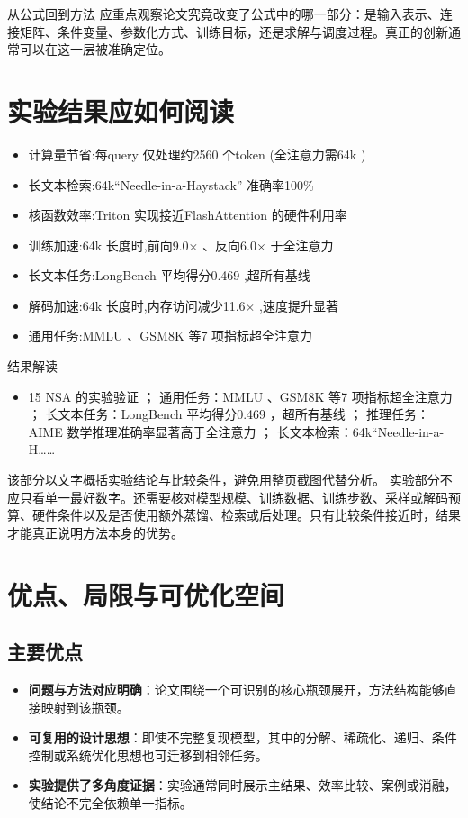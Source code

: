 \documentclass[UTF8,11pt,a4paper]{ctexart}
\newcommand{\term}[1]{\textbf{\textcolor{mainblue}{#1}}}
\begin{document}
\begin{keybox}{从公式回到方法}
应重点观察论文究竟改变了公式中的哪一部分：是输入表示、连接矩阵、条件变量、参数化方式、训练目标，还是求解与调度过程。真正的创新通常可以在这一层被准确定位。
\end{keybox}


\section{实验结果应如何阅读}
\begin{itemize}
\item 计算量节省:每query 仅处理约2560 个token (全注意力需64k )
\item 长文本检索:64k“Needle-in-a-Haystack” 准确率100\%
\item 核函数效率:Triton 实现接近FlashAttention 的硬件利用率
\item 训练加速:64k 长度时,前向9.0× 、反向6.0× 于全注意力
\item 长文本任务:LongBench 平均得分0.469 ,超所有基线
\item 解码加速:64k 长度时,内存访问减少11.6× ,速度提升显著
\item 通用任务:MMLU 、GSM8K 等7 项指标超全注意力
\end{itemize}

\begin{notebox}{结果解读}
\begin{itemize}
\item 15 NSA 的实验验证 ； 通用任务：MMLU 、GSM8K 等7 项指标超全注意力 ； 长文本任务：LongBench 平均得分0.469 ，超所有基线 ； 推理任务：AIME 数学推理准确率显著高于全注意力 ； 长文本检索：64k“Needle-in-a-H……
\end{itemize}
\end{notebox}

该部分以文字概括实验结论与比较条件，避免用整页截图代替分析。
实验部分不应只看单一最好数字。还需要核对模型规模、训练数据、训练步数、采样或解码预算、硬件条件以及是否使用额外蒸馏、检索或后处理。只有比较条件接近时，结果才能真正说明方法本身的优势。

\section{优点、局限与可优化空间}
\subsection{主要优点}
\begin{itemize}
\item \term{问题与方法对应明确}：论文围绕一个可识别的核心瓶颈展开，方法结构能够直接映射到该瓶颈。
\item \term{可复用的设计思想}：即使不完整复现模型，其中的分解、稀疏化、递归、条件控制或系统优化思想也可迁移到相邻任务。
\item \term{实验提供了多角度证据}：实验通常同时展示主结果、效率比较、案例或消融，使结论不完全依赖单一指标。
\end{itemize}
\end{document}
